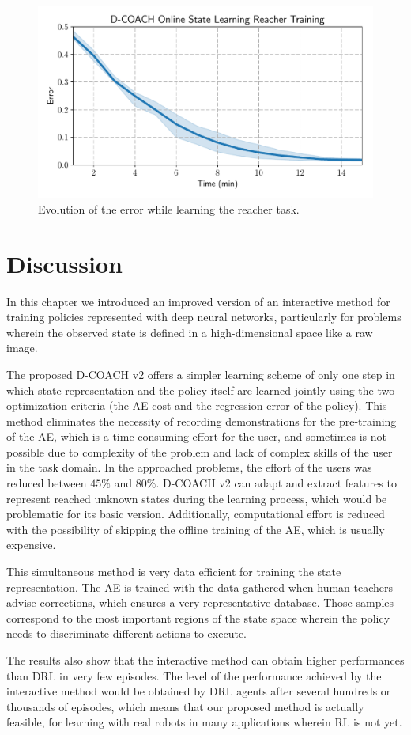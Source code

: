 \begin{figure}[H]
    \centering
    \includegraphics[width=0.9\linewidth]{imagenes/cap3/reacher_ICRA.pdf}
    \caption{Evolution of the error while learning the reacher task. }
    \label{fig:reacher_exp}
\end{figure}

\section{Discussion}

In this chapter we introduced an improved version of an interactive method for training policies represented with deep neural networks, particularly for problems wherein the observed state is defined in a high-dimensional space like a raw image.

The proposed D-COACH v2 offers a simpler learning scheme of only one step in which state representation and the policy itself are learned jointly using the two optimization criteria (the AE cost and the regression error of the policy). This method eliminates the necessity of recording demonstrations for the pre-training of the AE, which is a time consuming effort for the user, and sometimes is not possible due to complexity of the problem and lack of complex skills of the user in the task domain. In the approached problems, the effort of the users was reduced between $45\%$ and $80\%$. D-COACH v2 can adapt and extract features to represent reached unknown states during the learning process, which would be problematic for its basic version. Additionally, computational effort is reduced with the possibility of skipping the offline training of the AE, which is usually expensive. 

This simultaneous method is very data efficient for training the state representation. The AE is trained with the data gathered when human teachers advise corrections, which ensures a very representative database. Those samples correspond to the most important regions of the state space wherein the policy needs to discriminate different actions to execute.

The results also show that the interactive method can obtain higher performances than DRL in very few episodes. The level of the performance achieved by the interactive method would be obtained by DRL agents after several hundreds or thousands of episodes, which means that our proposed method is actually feasible, for learning with real robots in many applications wherein RL is not yet.